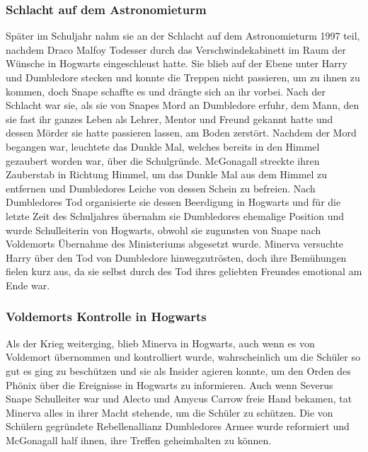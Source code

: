 \documentclass[a4paper, 10pt]{article}
\begin{document}
\subsubsection*{\large Schlacht auf dem Astronomieturm}
Später im Schuljahr nahm sie an der Schlacht auf dem Astronomieturm 1997 teil, nachdem Draco Malfoy Todesser durch das Verschwindekabinett im Raum der Wünsche in Hogwarts eingeschleust hatte. Sie blieb auf der Ebene unter Harry und Dumbledore stecken und konnte die Treppen nicht passieren, um zu ihnen zu kommen, doch Snape schaffte es und drängte sich an ihr vorbei.
\vspace{10pt}
\newline
Nach der Schlacht war sie, als sie von Snapes Mord an Dumbledore erfuhr, dem Mann, den sie fast ihr ganzes Leben als Lehrer, Mentor und Freund gekannt hatte und dessen Mörder sie hatte passieren lassen, am Boden zerstört. Nachdem der Mord begangen war, leuchtete das Dunkle Mal, welches bereits in den Himmel gezaubert worden war, über die Schulgründe. McGonagall streckte ihren Zauberstab in Richtung Himmel, um das Dunkle Mal aus dem Himmel zu entfernen und Dumbledores Leiche von dessen Schein zu befreien. Nach Dumbledores Tod organisierte sie dessen Beerdigung in Hogwarts und für die letzte Zeit des Schuljahres übernahm sie Dumbledores ehemalige Position und wurde Schulleiterin von Hogwarts, obwohl sie zugunsten von Snape nach Voldemorts Übernahme des Ministeriums abgesetzt wurde. Minerva versuchte Harry über den Tod von Dumbledore hinwegzutrösten, doch ihre Bemühungen fielen kurz aus, da sie selbst durch des Tod ihres geliebten Freundes emotional am Ende war.
\subsubsection*{\large Voldemorts Kontrolle in Hogwarts}
Als der Krieg weiterging, blieb Minerva in Hogwarts, auch wenn es von Voldemort übernommen und kontrolliert wurde, wahrscheinlich um die Schüler so gut es ging zu beschützen und sie als Insider agieren konnte, um den Orden des Phönix über die Ereignisse in Hogwarts zu informieren. Auch wenn Severus Snape Schulleiter war und Alecto und Amycus Carrow freie Hand bekamen, tat Minerva alles in ihrer Macht stehende, um die Schüler zu schützen. Die von Schülern gegründete Rebellenallianz Dumbledores Armee wurde reformiert und McGonagall half ihnen, ihre Treffen geheimhalten zu können.
\end{document}
